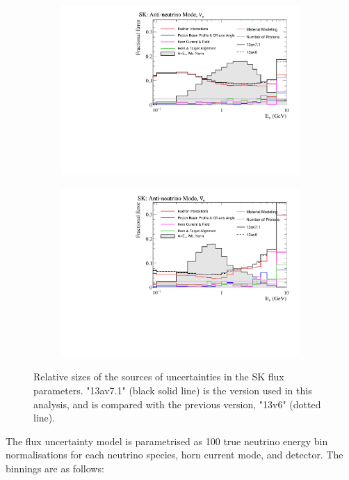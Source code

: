\begin{figure}[!htbp]
\begin{subfigure}{.49\textwidth}
\end{subfigure}
\begin{subfigure}{.49\textwidth}
  \centering
  \includegraphics[width=0.99\linewidth]{figs/flux_error_t2k_sk_rhc_nue}
\end{subfigure}
\begin{subfigure}{.49\textwidth}
  \centering
  \includegraphics[width=0.99\linewidth]{figs/flux_error_t2k_sk_rhc_nuebar}
\end{subfigure}
\caption{Relative sizes of the sources of uncertainties in the SK flux parameters. "13av7.1" (black solid line) is the version used in this analysis, and is compared with the previous version, "13v6" (dotted line). }\label{fig:fluxsourceSK}
\end{figure}

The flux uncertainty model is parametrised as 100 true neutrino energy bin normalisations for each neutrino species, horn current mode, and detector. The binnings are as follows:

